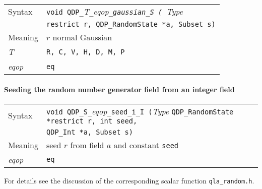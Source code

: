 \documentclass{article}
\newcommand{\tInt}{QDP\ttdash Int }
\newcommand{\tRandomState}{QDP\ttdash RandomState }
\newcommand{\namespace}{QDP}
\newcommand{\allFloatTypes}{{\tt R, C, V, H, D, M, P}}
\newcommand{\ttdash}{{\tt \_}}
\newcommand{\itt}{\it T}
\newcommand{\extraarg}{, Subset s}
\begin{document}
\begin{flushleft}
  \begin{tabular}{|l|l|}
  \hline
  Syntax      & {\tt void \namespace}\ttdash\itt\ttdash{\it eqop}\ttdash{\tt gaussian}\ttdash{\tt S ( }{\it Type } \\
              & {\tt *restrict r, \tRandomState *a\extraarg)} \\
  \hline
  Meaning     & $r$ normal Gaussian \\
  \hline
  \itt        & \allFloatTypes \\
  \hline
  {\it eqop}  & {\tt eq} \\
  \hline
  \end{tabular}
\end{flushleft}

\paragraph{Seeding the random number generator field from an integer field}

\begin{flushleft}
  \begin{tabular}{|l|l|}
  \hline
  Syntax      & {\tt void \namespace}\ttdash{\tt S}\ttdash{\it eqop}\ttdash{\tt seed}\ttdash{\tt i}\ttdash{\tt I (}{\it Type }{\tt \tRandomState *restrict r, int seed,}\\
              & {\tt \tInt *a\extraarg)} \\
  \hline
  Meaning     & seed $r$ from field $a$ and constant {\tt seed}\\
  \hline
  {\it eqop}  & {\tt eq} \\
  \hline
  \end{tabular}
\end{flushleft}

For details see the discussion of the corresponding scalar function
{\tt qla}\ttdash{\tt random.h}.
\end{document}
